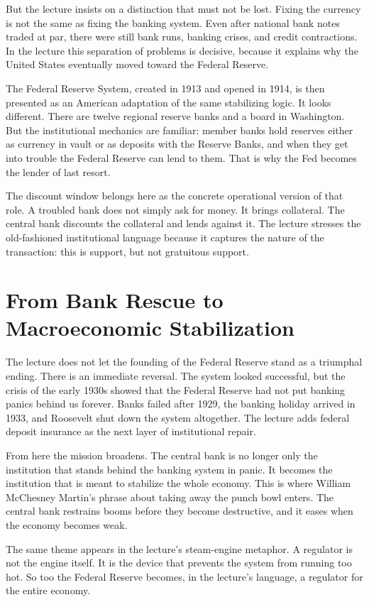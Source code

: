But the lecture insists on a distinction that must not be lost. Fixing the currency is not the same as fixing the banking system. Even after national bank notes traded at par, there were still bank runs, banking crises, and credit contractions. In the lecture this separation of problems is decisive, because it explains why the United States eventually moved toward the Federal Reserve.

The Federal Reserve System, created in 1913 and opened in 1914, is then presented as an American adaptation of the same stabilizing logic. It looks different. There are twelve regional reserve banks and a board in Washington. But the institutional mechanics are familiar: member banks hold reserves either as currency in vault or as deposits with the Reserve Banks, and when they get into trouble the Federal Reserve can lend to them. That is why the Fed becomes the lender of last resort.

The discount window belongs here as the concrete operational version of that role. A troubled bank does not simply ask for money. It brings collateral. The central bank discounts the collateral and lends against it. The lecture stresses the old-fashioned institutional language because it captures the nature of the transaction: this is support, but not gratuitous support.

\section{From Bank Rescue to Macroeconomic Stabilization}

The lecture does not let the founding of the Federal Reserve stand as a triumphal ending. There is an immediate reversal. The system looked successful, but the crisis of the early 1930s showed that the Federal Reserve had not put banking panics behind us forever. Banks failed after 1929, the banking holiday arrived in 1933, and Roosevelt shut down the system altogether. The lecture adds federal deposit insurance as the next layer of institutional repair.

From here the mission broadens. The central bank is no longer only the institution that stands behind the banking system in panic. It becomes the institution that is meant to stabilize the whole economy. This is where William McChesney Martin's phrase about taking away the punch bowl enters. The central bank restrains booms before they become destructive, and it eases when the economy becomes weak.

The same theme appears in the lecture's steam-engine metaphor. A regulator is not the engine itself. It is the device that prevents the system from running too hot. So too the Federal Reserve becomes, in the lecture's language, a regulator for the entire economy.


